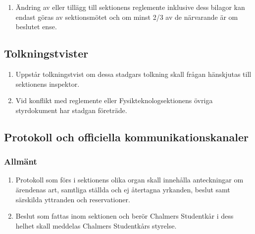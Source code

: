 \documentclass[11pt,a4paper]{article}
\begin{document}
\begin{enumerate}[\thesubsection .1]

  \item Ändring av eller tillägg till sektionens reglemente inklusive
  dess bilagor kan endast göras av sektionsmötet och om minst 2/3 av
  de närvarande är om beslutet ense.

\end{enumerate}

\subsection{Tolkningstvister}

\begin{enumerate}[\thesubsection .1]

  \item Uppstår tolkningstvist om dessa stadgars tolkning skall frågan
  hän\-skju\-tas till sektionens inspektor.
  
  \item Vid konflikt med reglemente eller Fysikteknologsektionens övriga styrdokument har stadgan företräde.

\end{enumerate}



\subsection{Protokoll och officiella kommunikationskanaler}

\subsubsection{Allmänt}

\begin{enumerate}[\thesubsection .1]

  \item Protokoll som förs i sektionens olika organ skall innehålla
  anteckningar om ärendenas art, samtliga ställda och ej återtagna
  yrkanden, beslut samt särskilda yttranden och reservationer.

  \item Beslut som fattas inom sektionen och berör Chalmers Studentkår i dess helhet skall meddelas Chalmers Studentkårs styrelse.

\end{enumerate}
\end{document}
